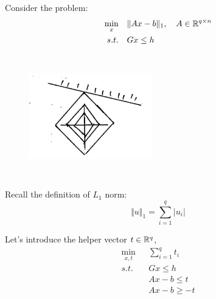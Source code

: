 \begin{example}
	Consider the problem:
	\begin{align*}
		\min_x\quad &\Vert Ax - b\Vert _1, \quad A\in \mathbb{R}^{q\times n}\\
		s.t. \quad&Gx\leq h
	\end{align*}
	\begin{figure}
		\centering
		\includegraphics[width=2.1in,height=2.1in]{figures/ch07/figure1016_3.png}
	\end{figure}
	
	Recall the definition of $L_1$ norm:
	\begin{equation*}
		\Vert u\Vert_1 = \sum^q_{i=1} |u_i|
	\end{equation*}
	
	
	Let's introduce the helper vector $t\in \mathbb{R}^q$,
	\begin{align*}
		\min_{x,t} &\sum^q_{i=1}t_i\\
		s.t. \quad&Gx \leq h\\
		&Ax -b \leq t\\
		&Ax -b \geq -t
	\end{align*}
	
\end{example}



